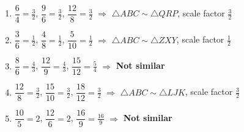 \documentclass[11pt]{article}
\newcommand{\ans}[1]{\textcolor{fmans}{\textbf{#1}}}
\begin{document}
\begin{enumerate}[label=\textbf{\arabic*.},start=1,itemsep=2mm,leftmargin=*]
\item $\dfrac{6}{4} = \tfrac{3}{2}$, \; $\dfrac{9}{6} = \tfrac{3}{2}$, \; $\dfrac{12}{8} = \tfrac{3}{2}$ \;$\Rightarrow$\; \ans{$\triangle ABC \sim \triangle QRP$}, scale factor \ans{$\tfrac{3}{2}$}
\item $\dfrac{3}{6} = \tfrac{1}{2}$, \; $\dfrac{4}{8} = \tfrac{1}{2}$, \; $\dfrac{5}{10} = \tfrac{1}{2}$ \;$\Rightarrow$\; \ans{$\triangle ABC \sim \triangle ZXY$}, scale factor \ans{$\tfrac{1}{2}$}
\item $\dfrac{8}{6} = \tfrac{4}{3}$, \; $\dfrac{12}{9} = \tfrac{4}{3}$, \; $\dfrac{15}{12} = \tfrac{5}{4}$ \;$\Rightarrow$\; \ans{Not similar}
\item $\dfrac{12}{8} = \tfrac{3}{2}$, \; $\dfrac{15}{10} = \tfrac{3}{2}$, \; $\dfrac{18}{12} = \tfrac{3}{2}$ \;$\Rightarrow$\; \ans{$\triangle ABC \sim \triangle LJK$}, scale factor \ans{$\tfrac{3}{2}$}
\item $\dfrac{10}{5} = 2$, \; $\dfrac{12}{6} = 2$, \; $\dfrac{16}{9} = \tfrac{16}{9}$ \;$\Rightarrow$\; \ans{Not similar}
\end{enumerate}
\end{document}
